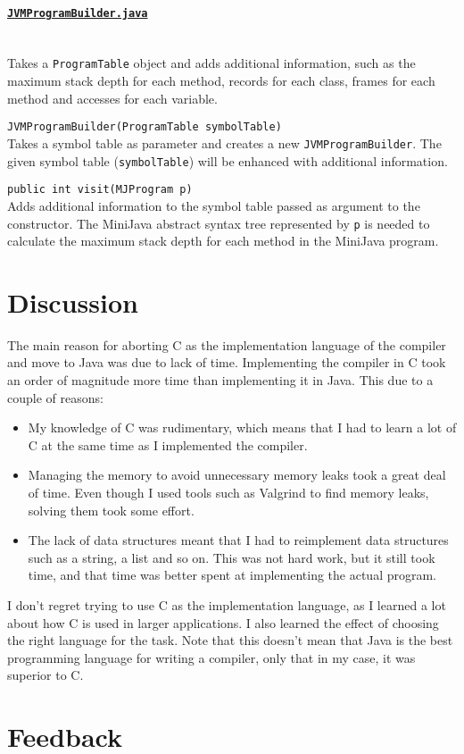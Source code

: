 \documentclass[11pt,oneside,a4paper]{article}
\newcommand{\code}[1]{\texttt{#1}}
\newcommand{\class}[1]{\underline{\texttt{#1}}}
\begin{document}
\paragraph{\class{JVMProgramBuilder.java}} \hfill \\
Takes a \code{ProgramTable} object and adds additional information, such as the
maximum stack depth for each method, records for each class, frames for each
method and accesses for each variable.
\label{par:JVMProgramBuilder}
\begin{description}
    \item{\code{JVMProgramBuilder(ProgramTable symbolTable)}} \hfill \\
        Takes a symbol table as parameter and creates a new
        \code{JVMProgramBuilder}. The given symbol table (\code{symbolTable})
        will be enhanced with additional information.
    \item{\code{public int visit(MJProgram p)}} \hfill \\
        Adds additional information to the symbol table passed as argument to
        the constructor. The MiniJava abstract syntax tree represented by
        \code{p} is needed to calculate the maximum stack depth for each method
        in the MiniJava program.
\end{description}

\section{Discussion}
\label{sec:discussion}
The main reason for aborting C as the implementation language of the compiler
and move to Java was due to lack of time. Implementing the compiler in C took 
an order of magnitude more time than implementing it in Java. This due to a 
couple of reasons:
\begin{itemize}
\item
    My knowledge of C was rudimentary, which means that I had to learn a lot of
    C at the same time as I implemented the compiler.
\item
    Managing the memory to avoid unnecessary memory leaks took a great deal of
    time. Even though I used tools such as Valgrind to find memory leaks,
    solving them took some effort.
\item
    The lack of data structures meant that I had to reimplement data structures
    such as a string, a list and so on. This was not hard work, but it still
    took time, and that time was better spent at implementing the actual 
    program. 
\end{itemize}
I don't regret trying to use C as the implementation language, as I learned a
lot about how C is used in larger applications. I also learned the effect of
choosing the right language for the task. Note that this doesn't mean that Java 
is the best programming language for writing a compiler, 
only that in my case, it was superior to C.

\appendix
\section{Feedback}
\end{document}
